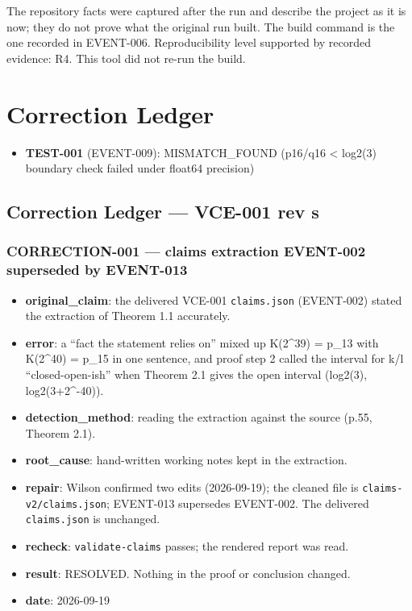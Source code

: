 \documentclass[11pt]{article}
\begin{document}
The repository facts were captured after the run and describe the project as it is now; they do not prove what the original run built. The build command is the one recorded in EVENT-006.
Reproducibility level supported by recorded evidence: R4. This tool did not re-run the build.
\section{Correction Ledger}
\begin{itemize}
\item \textbf{TEST-001} (EVENT-009): MISMATCH\_FOUND (p16/q16 < log2(3) boundary check failed under float64 precision)
\end{itemize}
\subsection*{Correction Ledger --- VCE-001 rev s}
\subsubsection*{CORRECTION-001 --- claims extraction EVENT-002 superseded by EVENT-013}
\begin{itemize}
\item \textbf{original\_claim}: the delivered VCE-001 \texttt{claims.json} (EVENT-002) stated the extraction of Theorem 1.1 accurately.
\item \textbf{error}: a ``fact the statement relies on'' mixed up K(2\textasciicircum{}39) = p\_13 with K(2\textasciicircum{}40) = p\_15 in one sentence, and proof step 2 called the interval for k/l ``closed-open-ish'' when Theorem 2.1 gives the open interval (log2(3), log2(3+2\textasciicircum{}-40)).
\item \textbf{detection\_method}: reading the extraction against the source (p.55, Theorem 2.1).
\item \textbf{root\_cause}: hand-written working notes kept in the extraction.
\item \textbf{repair}: Wilson confirmed two edits (2026-09-19); the cleaned file is \texttt{claims-v2/claims.json}; EVENT-013 supersedes EVENT-002. The delivered \texttt{claims.json} is unchanged.
\item \textbf{recheck}: \texttt{validate-claims} passes; the rendered report was read.
\item \textbf{result}: RESOLVED. Nothing in the proof or conclusion changed.
\item \textbf{date}: 2026-09-19
\end{itemize}
\end{document}
